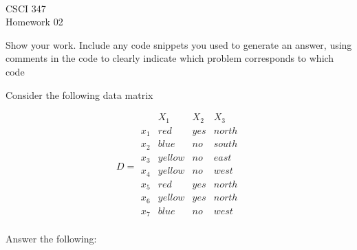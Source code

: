 \documentclass[11pt]{article}
\newcommand{\course}{CSCI 347}
\newcommand{\proj}{Homework 02}
\begin{document}
{ ~\\
    \course \\ 
    \proj \\ 
}

Show your work. Include any code snippets you used to generate an answer, using
comments in the code to clearly indicate which problem corresponds to which code

Consider the following data matrix

$$
    D = \begin{matrix}
            & X_1    & X_2   & X_3   \\
        x_1 & red    & yes   & north \\
        x_2 & blue   & no    & south \\
        x_3 & yellow & no    & east  \\
        x_4 & yellow & no    & west  \\
        x_5 & red    & yes   & north \\
        x_6 & yellow & yes   & north \\
        x_7 & blue   & no    & west  \\
    \end{matrix}
$$

Answer the following:
\end{document}
